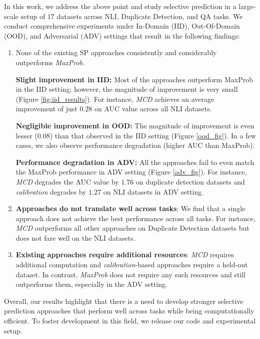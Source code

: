 \documentclass[11pt]{article}
\begin{document}
In this work, we address the above point and study selective prediction in a large-scale setup of $17$ datasets across NLI, Duplicate Detection, and QA tasks. 
We conduct comprehensive experiments under In-Domain (IID), Out-Of-Domain (OOD), and Adversarial (ADV) settings that result in the following findings:
\begin{enumerate}[noitemsep,nosep,leftmargin=*]
    \item None of the existing SP approaches consistently and considerably outperforms \textit{MaxProb}.
    
    \textbf{Slight improvement in IID:} Most of the approaches outperform MaxProb in the IID setting; however, the magnitude of improvement is very small (Figure \ref{fig:iid_results}). For instance, \textit{MCD} achieves an average improvement of just $0.28$ on AUC value across all NLI datasets.
    
    \textbf{Negligible improvement in OOD:} 
    The magnitude of improvement is even lesser ($0.08$) than that observed in the IID setting (Figure \ref{ood_fig}). 
    In a few cases, we also observe performance degradation (higher AUC than MaxProb). 
    
    \textbf{Performance degradation in ADV:} All the approaches fail to even match the MaxProb performance in ADV setting (Figure \ref{adv_fig}). For instance, \textit{MCD} degrades the AUC value by $1.76$ on duplicate detection datasets and \textit{calibration} degrades by $1.27$ on NLI datasets in ADV setting.
    
    
    \item \textbf{Approaches do not translate well across tasks}: We find that a single approach does not achieve the best performance across all tasks. For instance, \textit{MCD} outperforms all other approaches on Duplicate Detection datasets but does not fare well on the NLI datasets.  
    
    \item \textbf{Existing approaches require additional resources}: \textit{MCD} requires additional computation and \textit{calibration}-based approaches require a held-out dataset. 
    In contrast, \textit{MaxProb} does not require any such resources and still outperforms them, especially in the ADV setting.
    
\end{enumerate}

Overall, our results highlight that there is a need to develop stronger selective prediction approaches that perform well across tasks while being computationally efficient. 
To foster development in this field, we release our code and experimental setup.
\end{document}

